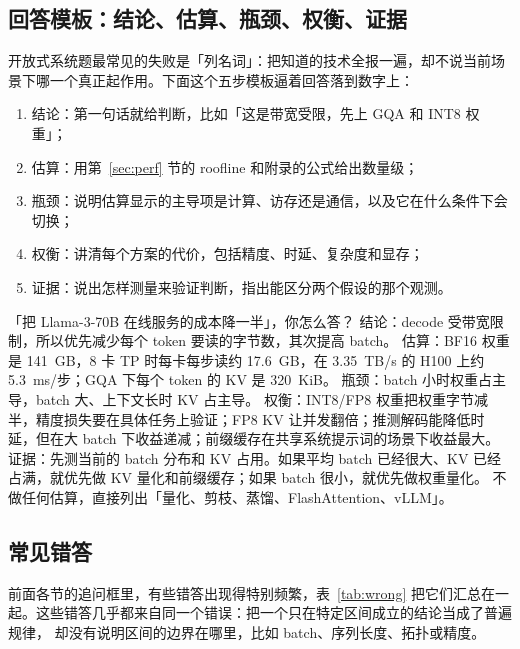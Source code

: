 \subsection{回答模板：结论、估算、瓶颈、权衡、证据}

开放式系统题最常见的失败是「列名词」：把知道的技术全报一遍，却不说当前场景下哪一个真正起作用。下面这个五步模板逼着回答落到数字上：
\begin{enumerate}
\item 结论：第一句话就给判断，比如「这是带宽受限，先上 GQA 和 INT8 权重」；
\item 估算：用第~\ref{sec:perf} 节的 roofline 和附录的公式给出数量级；
\item 瓶颈：说明估算显示的主导项是计算、访存还是通信，以及它在什么条件下会切换；
\item 权衡：讲清每个方案的代价，包括精度、时延、复杂度和显存；
\item 证据：说出怎样测量来验证判断，指出能区分两个假设的那个观测。
\end{enumerate}

\begin{qa}{「把 Llama-3-70B 在线服务的成本降一半」，你怎么答？}
\ans 结论：decode 受带宽限制，所以优先减少每个 token 要读的字节数，其次提高 batch。
估算：BF16 权重是 141~GB，8 卡 TP 时每卡每步读约 17.6~GB，在 3.35~TB/s 的 H100 上约 5.3~ms/步；GQA 下每个 token 的 KV 是 320~KiB。
瓶颈：batch 小时权重占主导，batch 大、上下文长时 KV 占主导。
权衡：INT8/FP8 权重把权重字节减半，精度损失要在具体任务上验证；FP8 KV 让并发翻倍；推测解码能降低时延，但在大 batch 下收益递减；前缀缓存在共享系统提示词的场景下收益最大。
证据：先测当前的 batch 分布和 KV 占用。如果平均 batch 已经很大、KV 已经占满，就优先做 KV 量化和前缀缓存；如果 batch 很小，就优先做权重量化。
\wrong 不做任何估算，直接列出「量化、剪枝、蒸馏、FlashAttention、vLLM」。
\end{qa}

\subsection{常见错答}

前面各节的追问框里，有些错答出现得特别频繁，表~\ref{tab:wrong} 把它们汇总在一起。这些错答几乎都来自同一个错误：把一个只在特定区间成立的结论当成了普遍规律，
却没有说明区间的边界在哪里，比如 batch、序列长度、拓扑或精度。

